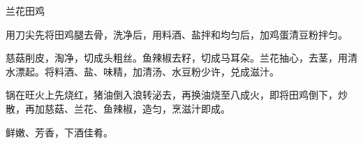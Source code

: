 %
%
%
%
%
%
%
\begin{recipe}{兰花田鸡}

\ingredients


\preparation

\step 用刀尖先将田鸡腿去骨，洗净后，用料酒、盐拌和均匀后，加鸡蛋清豆粉拌匀。

\step 慈菇削皮，淘净，切成头粗丝。鱼辣椒去籽，切成马耳朵。兰花抽心，去茎，用清
水漂起。将料酒、盐、味精，加清汤、水豆粉少许，兑成滋汁。

\step 锅在旺火上先烧红，猪油倒入浪转泌去，再换油烧至八成火，即将田鸡倒下，炒
散，再加慈菇、兰花、鱼辣椒，造匀，烹滋汁即成。

\features

鲜嫩、芳香，下酒佳肴。

\end{recipe}

